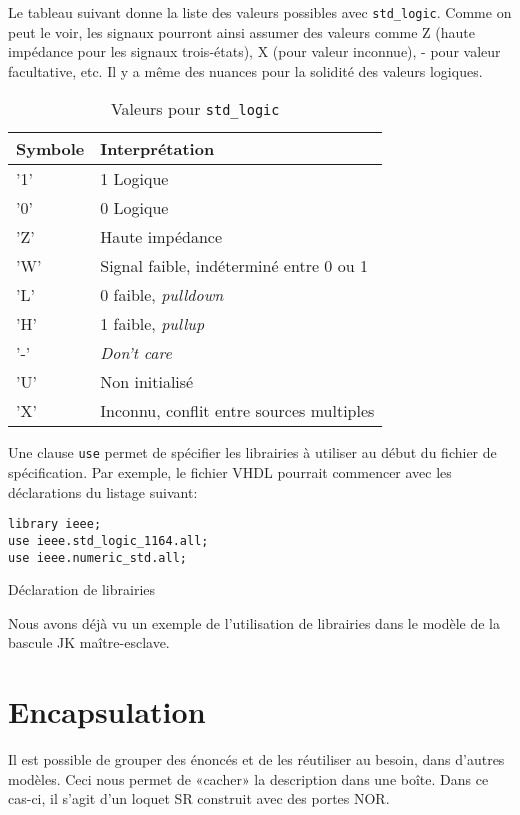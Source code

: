 \documentclass[letter, oneside]{book}
\begin{document}
Le tableau suivant donne la liste des valeurs possibles avec
\texttt{std\_logic}. Comme on peut le voir, les signaux pourront ainsi assumer
des valeurs comme Z (haute impédance pour les signaux trois-états), X
(pour valeur inconnue), - pour valeur facultative, etc. Il y a même
des nuances pour la solidité des valeurs logiques.

\begin{table}[htbp]
\caption{\label{tab:org0d41a6f}Valeurs pour \texttt{std\_logic}}
\centering
\begin{tabular}{ll}
Symbole & Interprétation\\[0pt]
\hline
'1' & 1 Logique\\[0pt]
'0' & 0 Logique\\[0pt]
'Z' & Haute impédance\\[0pt]
'W' & Signal faible, indéterminé entre 0 ou 1\\[0pt]
'L' & 0 faible, \emph{pulldown}\\[0pt]
'H' & 1 faible, \emph{pullup}\\[0pt]
'-' & \emph{Don't care}\\[0pt]
'U' & Non initialisé\\[0pt]
'X' & Inconnu, conflit entre sources multiples\\[0pt]
\end{tabular}
\end{table}

Une clause \texttt{use} permet de spécifier les librairies à utiliser au
début du fichier de spécification. Par exemple, le fichier VHDL
pourrait commencer avec les déclarations du listage suivant:

\begin{listing}[htbp]
\begin{verbatim}
library ieee;
use ieee.std_logic_1164.all;
use ieee.numeric_std.all;
\end{verbatim}
\caption{Déclaration de librairies}
\end{listing}

Nous avons déjà vu un exemple de l'utilisation de librairies dans le modèle
de la bascule JK maître-esclave.

\section{Encapsulation}
\label{sec:org54b78c5}

Il est possible de grouper des énoncés et de les réutiliser
au besoin, dans d'autres modèles. Ceci nous permet de «cacher» la
description dans une boîte. Dans ce cas-ci, il s'agit d'un loquet SR
construit avec des portes NOR.
\end{document}
